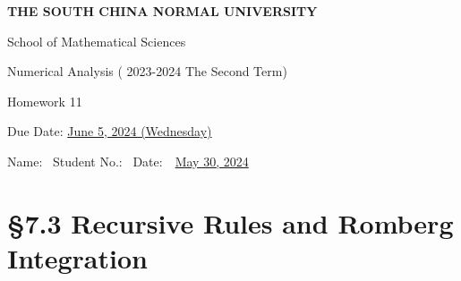 \documentclass[UTF8,12pt,hyperref]{ctexart}
\begin{document}

\begin{center}
{\bf  THE SOUTH CHINA NORMAL UNIVERSITY\vspace{0.08cm}

School of Mathematical Sciences\vspace{0.08cm}
 
Numerical Analysis ( 2023-2024 The Second Term) \vspace{0.18cm}

{\Large Homework 11 }\vspace{0.18cm}

Due Date: \underline{June 5, 2024 (Wednesday)} }
\end{center}\vspace{-0.16cm}

\begin{center}
Name:\ \underline{\hspace{4cm}}\hspace{0.298cm}  
% 
Student No.:\ \underline{\hspace{4cm}} 
%
Date:\ \ \underline{May  30, 2024} 
 \end{center}
 
 

\section*{\S 7.3  Recursive Rules and Romberg Integration}
 
\end{document}
